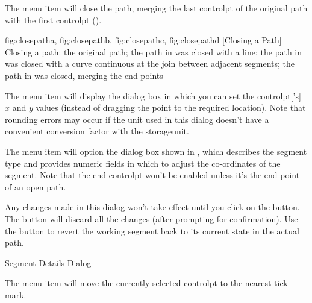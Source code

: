 
The  menu item will
close the path, merging the last \gls*{controlpt} of the original
path with the first \gls*{controlpt} ().

{%
  {fig:closepatha}{}{},
  {fig:closepathb}{}{},
  {fig:closepathc}{}{},
  {fig:closepathd}{}{}
}
[Closing a Path]
{Closing a path:  the original path;
the path in  was closed with a line;
 the path in  was closed with a
curve continuous at the join between adjacent segments;
 the path in  was closed, merging
the end points}


The  menu item will display the
 dialog box in which you can set the
\gls{controlpt}['s] $x$ and $y$ values (instead of dragging the
point to the required location).  Note that rounding errors may
occur if the unit used in this dialog doesn't have a convenient
conversion factor with the \gls{storageunit}.


The  menu item will option the 
 dialog box shown in
, which describes the segment type and
provides numeric fields in which to adjust the co-ordinates of the
segment. Note that the end \gls{controlpt} won't be enabled unless 
it's the end point of an open path.

Any changes made in this dialog won't take effect until you click on
the  button. The  button will discard all the
changes (after prompting for confirmation). Use the 
 button to revert the working segment
back to its current state in the actual path.

{}
{Segment Details Dialog}


The  menu item will
move the currently selected \gls*{controlpt} to the nearest
tick mark.

